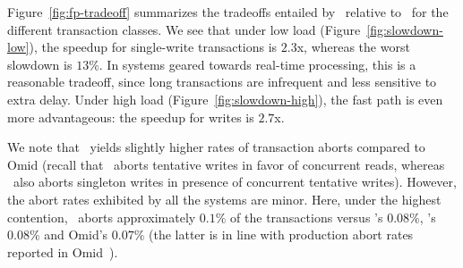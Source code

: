 Figure~\ref{fig:fp-tradeoff} summarizes the tradeoffs entailed by \sys\ relative to \sysll\ for the different transaction classes. 
We see that under low load (Figure~\ref{fig:slowdown-low}),
the speedup for single-write transactions is $2.3$x, whereas the worst slowdown is $13\%$. 
In systems geared towards real-time processing, this is a reasonable tradeoff, since long transactions 
are infrequent and less sensitive to extra delay.
Under high load (Figure~\ref{fig:slowdown-high}), the fast path is even more advantageous: the speedup for writes is $2.7$x.




We note that \sys\ yields slightly higher rates of transaction aborts compared to Omid 
(recall that \sysll\ aborts tentative writes in favor of concurrent reads, whereas  \sys\ also aborts
singleton writes in presence of concurrent tentative writes). However, the abort rates exhibited by all  
the systems are minor. 
Here, under the highest contention,  \sys\ aborts approximately $0.1\%$ 
of the transactions versus  \sysll's $0.08\%$,   
 \syspc's $0.08\%$ 
and Omid's $0.07\%$ 
(the latter  is in line with production abort rates reported in Omid~\cite{Omid2017}).  



